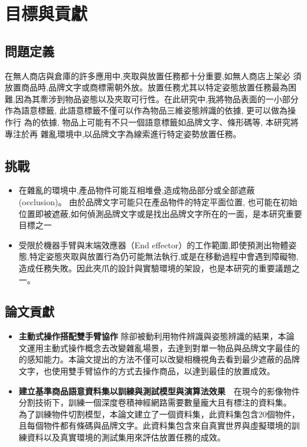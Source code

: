 \section{目標與貢獻}

\subsection{問題定義}
在無人商店與倉庫的許多應用中,夾取與放置任務都十分重要,如無人商店上架必
須放置商品時,品牌文字或商標需朝外放。放置任務尤其以特定姿態放置任務最為困
難,因為其牽涉到物品姿態以及夾取可行性。在此研究中,我將物品表面的一小部分
作為語意標籤, 此語意標籤不僅可以作為物品三維姿態辨識的依據, 更可以做為操作行
為的依據, 物品上可能有不只一個語意標籤如品牌文字、條形碼等, 本研究將專注於再
雜亂環境中,以品牌文字為線索進行特定姿勢放置任務。

\subsection{挑戰}
\begin{itemize}
\item 在雜亂的環境中,產品物件可能互相堆疊,造成物品部分或全部遮蔽 (occlusion)。
由於品牌文字可能只在產品物件的特定平面位置, 也可能在初始位置即被遮蔽,如何偵測品牌文字或是找出品牌文字所在的一面，是本研究重要目標之一
\item 受限於機器手臂與末端效應器（End effector）的工作範圍,即使預測出物體姿態,特定姿態夾取與放置行為仍可能無法執行,或是在移動過程中會遇到障礙物,造成任務失敗。因此夾爪的設計與實驗環境的架設，也是本研究的重要議題之一。
\end{itemize}

\subsection{論文貢獻}
\begin{itemize}
\item \textbf{主動式操作搭配雙手臂協作} 除卻被動利用物件辨識與姿態辨識的結果，本論文運用主動式操作概念去改變雜亂場景，去達到對單一物品與品牌文字最佳的的感知能力。本論文提出的方法不僅可以改變相機視角去看到最少遮蔽的品牌文字，也使用雙手臂協作的方式去操作商品，以達到最佳的放置成效。
\item \textbf{建立基準商品語意資料集以訓練與測試模型與演算法效果}　在現今的影像物件分割技術下，訓練一個深度卷積神經網路需要數量龐大且有標注的資料集。
為了訓練物件切割模型，本論文建立了一個資料集，此資料集包含20個物件，且每個物件都有條碼與品牌文字。此資料集包含來自真實世界與虛擬環境的訓練資料以及真實環境的測試集用來評估放置任務的成效。
\end{itemize}

